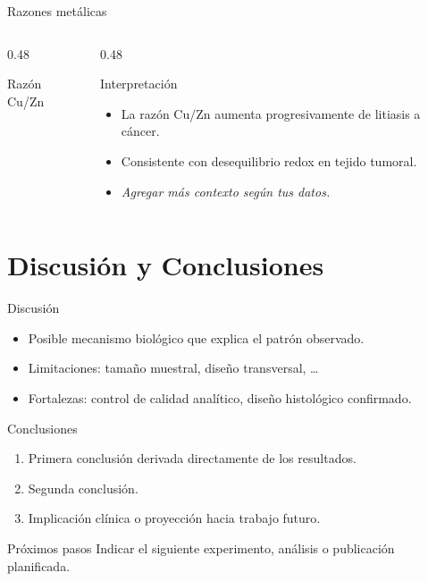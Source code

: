 \documentclass[aspectratio=169, 11pt]{beamer}
\begin{document}
\begin{frame}{Razones metálicas}
  \begin{columns}[T]
    \begin{column}{0.48\textwidth}
      \begin{center}
        {\small Razón Cu/Zn}
      \end{center}
    \end{column}
    \begin{column}{0.48\textwidth}
      \begin{exampleblock}{Interpretación}
        \begin{itemize}
          \item La razón Cu/Zn aumenta progresivamente de litiasis a cáncer.
          \item Consistente con desequilibrio redox en tejido tumoral.
          \item \textit{Agregar más contexto según tus datos.}
        \end{itemize}
      \end{exampleblock}
    \end{column}
  \end{columns}
\end{frame}

\section{Discusión y Conclusiones}

\begin{frame}{Discusión}
  \begin{itemize}
    \item Posible mecanismo biológico que explica el patrón observado.
    \item Limitaciones: tamaño muestral, diseño transversal, \ldots
    \item Fortalezas: control de calidad analítico, diseño histológico confirmado.
  \end{itemize}
\end{frame}

\begin{frame}{Conclusiones}
  \begin{enumerate}
    \item Primera conclusión derivada directamente de los resultados.
    \item Segunda conclusión.
    \item Implicación clínica o proyección hacia trabajo futuro.
  \end{enumerate}

  \vspace{1em}
  \begin{alertblock}{Próximos pasos}
    Indicar el siguiente experimento, análisis o publicación planificada.
  \end{alertblock}
\end{frame}
\end{document}
